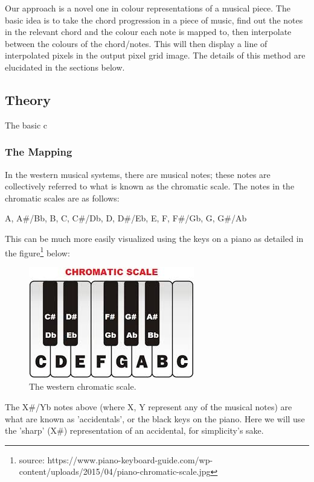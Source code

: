 \documentclass{article}
\begin{document}
Our approach is a novel one in colour representations of a musical piece. The basic idea is to take the chord progression in a piece of music, find out the notes in the relevant chord and the colour each note is mapped to, then interpolate between the colours of the chord/notes. This will then display a line of interpolated pixels in the output pixel grid image. The details of this method are elucidated in the sections below.

\subsection{Theory}

The basic c

\subsubsection{The Mapping}

In the western musical systems, there are musical notes; these notes are collectively referred to what is known as the chromatic scale. The notes in the chromatic scales are as follows:

\begin{center}
    {A, A\#/Bb, B, C, C\#/Db, D, D\#/Eb, E, F, F\#/Gb, G, G\#/Ab}
\end{center}

This can be much more easily visualized using the keys on a piano as detailed in the figure\footnote{source: https://www.piano-keyboard-guide.com/wp-content/uploads/2015/04/piano-chromatic-scale.jpg} below:

\begin{figure}
    \centering
    \includegraphics{chromatic.jpg}
    \caption{The western chromatic scale.}
    \label{fig:chroma}
\end{figure}

The X\#/Yb notes above (where {X, Y} represent any of the musical notes) are what are known as 'accidentals', or the black keys on the piano. Here we will use the 'sharp' (X\#) representation of an accidental, for simplicity's sake.\\
\end{document}
